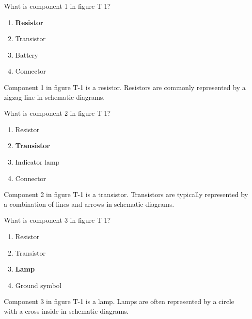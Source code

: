 
\begin{tcolorbox}[colback=gray!10!white,colframe=black!75!black,title={T6C02}]
    What is component 1 in figure T-1?
    \begin{enumerate}[label=\Alph*,noitemsep]
        \item \textbf{Resistor}
        \item Transistor
        \item Battery
        \item Connector
    \end{enumerate}
\end{tcolorbox}
Component 1 in figure T-1 is a resistor. Resistors are commonly represented by a zigzag line in schematic diagrams.


\begin{tcolorbox}[colback=gray!10!white,colframe=black!75!black,title={T6C03}]
    What is component 2 in figure T-1?
    \begin{enumerate}[label=\Alph*,noitemsep]
        \item Resistor
        \item \textbf{Transistor}
        \item Indicator lamp
        \item Connector
    \end{enumerate}
\end{tcolorbox}
Component 2 in figure T-1 is a transistor. Transistors are typically represented by a combination of lines and arrows in schematic diagrams.


\begin{tcolorbox}[colback=gray!10!white,colframe=black!75!black,title={T6C04}]
    What is component 3 in figure T-1?
    \begin{enumerate}[label=\Alph*,noitemsep]
        \item Resistor
        \item Transistor
        \item \textbf{Lamp}
        \item Ground symbol
    \end{enumerate}
\end{tcolorbox}
Component 3 in figure T-1 is a lamp. Lamps are often represented by a circle with a cross inside in schematic diagrams.


